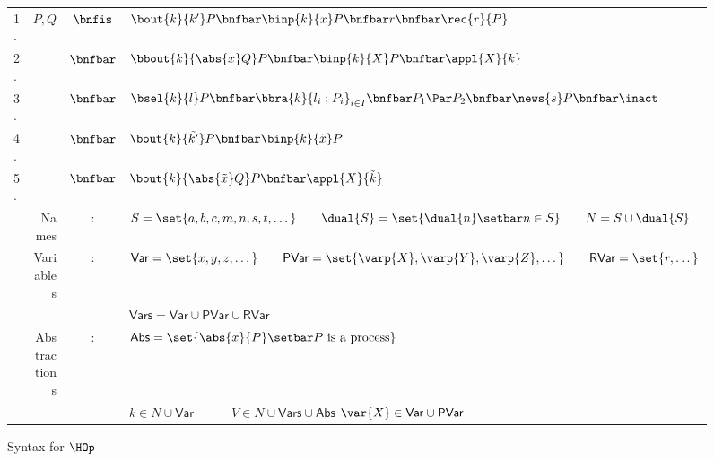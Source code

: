 \begin{figure}[t!]
		\begin{tabular}{lrcl}
			1. &	$P,Q$
			 	&$\bnfis$&	$\bout{k}{k'} P \bnfbar \binp{k}{x} P \bnfbar r \bnfbar \rec{r}{P}$ \\
			2. & 	&$\bnfbar$&	$\bbout{k}{\abs{x} Q} P \bnfbar \binp{k}{X} P \bnfbar \appl{X}{k}$ \\ 
			3. & 	&$\bnfbar$&	$\bsel{k}{l} P \bnfbar \bbra{k}{l_i:P_i}_{i \in I} \bnfbar 
						P_1 \Par P_2 \bnfbar \news{s} P \bnfbar \inact$ \\
			4. & 	&$\bnfbar$&	$\bout{k}{\tilde{k'}} P \bnfbar \binp{k}{\tilde{x}} P$\\
			5. & 	&$\bnfbar$&	$\bout{k}{\abs{\tilde{x}} Q} P \bnfbar \appl{X}{\tilde{k}}$\\
		&	Names & : & 	$S = \set{a, b, c, m, n, s, t, \dots} \qquad \dual{S} = \set{\dual{n} \setbar n \in S} \qquad N = S \cup \dual{S}$\\
		&	Variables & : &	$\mathsf{Var} = \set{x,y,z, \dots} \qquad \mathsf{PVar} = \set{\varp{X}, \varp{Y}, \varp{Z}, \dots}
					\qquad \mathsf{RVar} = \set{r, \dots}$\\
		&		& &	$\mathsf{Vars} = \mathsf{Var} \cup \mathsf{PVar} \cup \mathsf{RVar}$\\
		&	Abstractions & : & $\mathsf{Abs} = \set{\abs{x}{P} \setbar P \textrm{ is a process}}$\\
		&		& &	$k \in N \cup \mathsf{Var} \quad \qquad V \in N \cup \mathsf{Vars} \cup \mathsf{Abs}$ \quad \qquad $\var{X} \in \mathsf{Var} \cup \mathsf{PVar}$
		\end{tabular}
	\caption{Syntax for $\HOp$ \label{fig:syntax}}
\end{figure}

